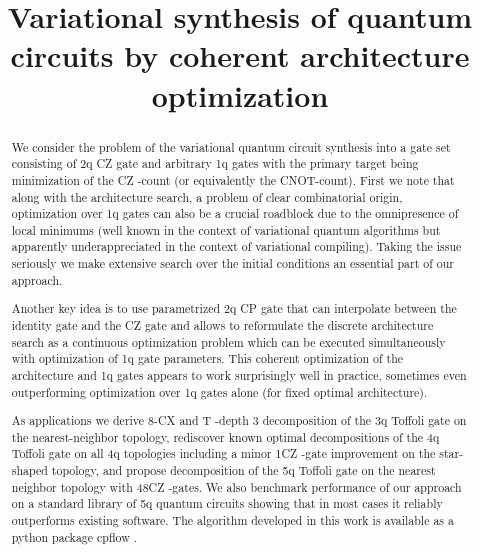 \documentclass[draft, amsfonts, amssymb, aps, nofootinbib, twocolumn]{revtex4-2}
\newcommand{\CZ}{CZ }
\newcommand{\CX}{CX }
\newcommand{\CP}{CP }
\newcommand{\T}{T }
\newcommand{\cpflow}{\textrm {cpflow }}
\begin{document}
\title{Variational synthesis of quantum circuits by coherent architecture optimization}
\begin{abstract}
We consider the problem of the variational quantum circuit synthesis into a gate set consisting of 2q \CZ  gate and arbitrary 1q gates with the primary target being minimization of the \CZ-count (or equivalently the CNOT-count). First we note that along with the architecture search, a problem of clear combinatorial origin, optimization over 1q gates can also be a crucial roadblock due to the omnipresence of local minimums (well known in the context of variational quantum algorithms but apparently underappreciated in the context of variational compiling). Taking the issue seriously we make extensive search over the initial conditions an essential part of our approach. 

Another key idea is to use parametrized 2q \CP gate that can interpolate between the identity gate and the \CZ gate and allows to reformulate the discrete architecture search as a continuous optimization problem which can be executed simultaneously with optimization of 1q gate parameters. This coherent optimization of the architecture and 1q gates appears to work surprisingly well in practice, sometimes even outperforming optimization over 1q gates alone (for fixed optimal architecture).

As applications we derive 8-\CX and \T-depth 3 decomposition of the 3q Toffoli gate on the nearest-neighbor topology, rediscover known optimal decompositions of the 4q Toffoli gate on all 4q topologies including a minor 1\CZ-gate improvement on the star-shaped topology, and propose decomposition of the 5q Toffoli gate on the nearest neighbor topology with 48\CZ-gates. We also benchmark performance of our approach on a standard library of 5q quantum circuits showing that in most cases it reliably outperforms existing software. The algorithm developed in this work is available as a python package \cpflow. 
\end{abstract}
\maketitle	
\tableofcontents
\end{document}
